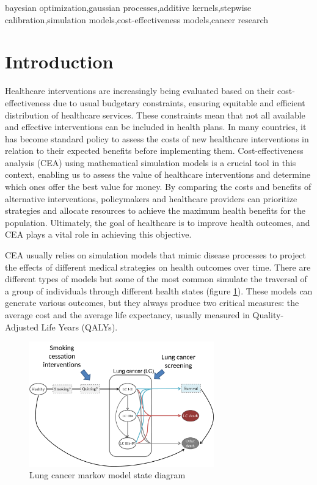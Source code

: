 \documentclass{IOS-Book-Article}
\def\hb{\hbox to 11.5 cm{}}
\begin{document}
\begin{frontmatter}
		\begin{keyword}
			bayesian optimization\sep gaussian processes\sep additive kernels\sep stepwise calibration\sep simulation models\sep cost-effectiveness models\sep  cancer research
		\end{keyword}
	\end{frontmatter}
	\markboth{December 2023\hb}{December 2023\hb}
	
	\section{Introduction}
	Healthcare interventions are increasingly being evaluated based on their cost-effectiveness due to usual budgetary constraints, ensuring equitable and efficient distribution of healthcare services. These constraints mean that not all available and effective interventions can be included in health plans. In many countries, it has become standard policy to assess the costs of new healthcare interventions in relation to their expected benefits before implementing them. Cost-effectiveness analysis (CEA) using mathematical simulation models is a crucial tool in this context, enabling us to assess the value of healthcare interventions and determine which ones offer the best value for money\cite{drummond}. By comparing the costs and benefits of alternative interventions, policymakers and healthcare providers can prioritize strategies and allocate resources to achieve the maximum health benefits for the population. Ultimately, the goal of healthcare is to improve health outcomes, and CEA plays a vital role in achieving this objective\cite{levin}.
	
	CEA usually relies on simulation models that mimic disease processes to project the effects of different medical strategies on health outcomes over time\cite{applied_he}. There are different types of models but some of the most common simulate the traversal of a group of individuals through different health states (figure \ref{fig:lung_model}). These models can generate various outcomes, but they always produce two critical measures: the average cost and the average life expectancy, usually measured in Quality-Adjusted Life Years (QALYs)\cite{qalys}.
	
	\begin{figure}[h!]
		\centering	
		\includegraphics[width=80mm]{figs/lungmodel.pdf}		
		\caption{Lung cancer markov model state diagram}	
		\label{fig:lung_model}	
	\end{figure}
	
\end{document}
